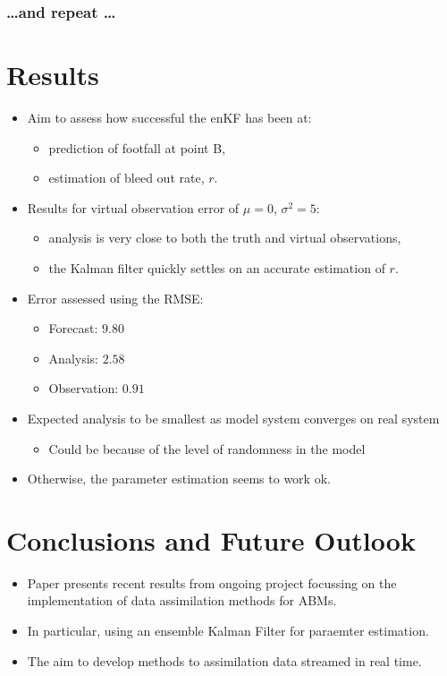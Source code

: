 \subsubsection{\ldots and repeat \ldots}
\label{methods:application:repeat}

\section{Results}
\label{malleson:results}

\begin{itemize}
    \item Aim to assess how successful the enKF has been at:
    \begin{itemize}
        \item prediction of footfall at point B,
        \item estimation of bleed out rate, $r$.
    \end{itemize}
    \item Results for virtual observation error of $\mu=0$, $\sigma^2 = 5$:
    \begin{itemize}
        \item analysis is very close to both the truth and virtual observations,
        \item the Kalman filter quickly settles on an accurate estimation of $r$.
    \end{itemize}
    \item Error assessed using the RMSE:
    \begin{itemize}
        \item Forecast: $9.80$
        \item Analysis: $2.58$
        \item Observation: $0.91$
    \end{itemize}
    \item Expected analysis to be smallest as model system converges on real system
    \begin{itemize}
        \item Could be because of the level of randomness in the model
    \end{itemize}
    \item Otherwise, the parameter estimation seems to work ok.
\end{itemize}

\section{Conclusions and Future Outlook}
\label{malleson:conclusion}

\begin{itemize}
    \item Paper presents recent results from ongoing project focussing on the implementation of data assimilation methods for ABMs.
    \item In particular, using an ensemble Kalman Filter for paraemter estimation.
    \item The aim to develop methods to assimilation data streamed in real time.
\end{itemize}